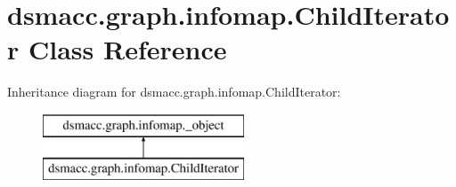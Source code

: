 \hypertarget{classdsmacc_1_1graph_1_1infomap_1_1ChildIterator}{}\section{dsmacc.\+graph.\+infomap.\+Child\+Iterator Class Reference}
\label{classdsmacc_1_1graph_1_1infomap_1_1ChildIterator}
Inheritance diagram for dsmacc.\+graph.\+infomap.\+Child\+Iterator\+:\begin{figure}[H]
\begin{center}
\leavevmode
\includegraphics[height=2.000000cm]{classdsmacc_1_1graph_1_1infomap_1_1ChildIterator}
\end{center}
\end{figure}
